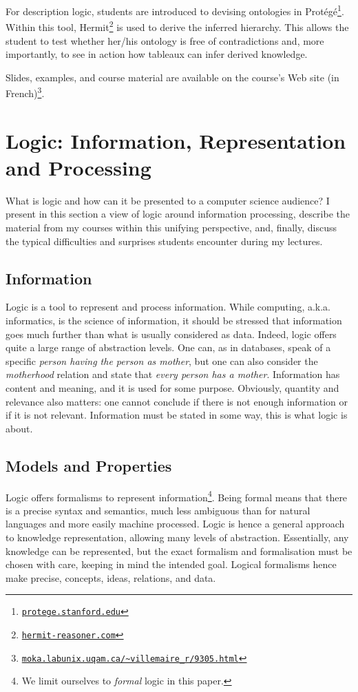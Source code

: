 \documentclass[a4paper,UKenglish]{lipics}
\begin{document}
For description logic, students are introduced to devising ontologies in Prot\'eg\'e\footnote{\href{http://protege.stanford.edu}{\nolinkurl{protege.stanford.edu}}}. Within this tool, Hermit\footnote{\href{http://hermit-reasoner.com}{\nolinkurl{hermit-reasoner.com}}} is used to derive the inferred hierarchy. This allows the student to test whether her/his ontology is free of contradictions and, more importantly, to see in action how tableaux can infer derived knowledge.

Slides, examples, and course material are available on the course's Web site (in French)\footnote{\href{http://moka.labunix.uqam.ca/~villemaire_r/9305.html}{\nolinkurl{moka.labunix.uqam.ca/~villemaire_r/9305.html}}}.
\section{Logic: Information, Representation and Processing}\label{SECLOG} What is logic and how can it be presented to a computer science audience? I present in this section a view of logic around information processing, describe the material from my courses within this unifying perspective, and, finally, discuss the typical difficulties and surprises students encounter during my lectures.
\subsection{Information} Logic is a tool to represent and process information. While computing, a.k.a. informatics, is the science of information, it should be stressed that information goes much further than what is usually considered as data. Indeed, logic offers quite a large range of abstraction levels. One can, as in databases, speak of a specific \emph{person  having the person  as mother}, but one can also consider the \emph{motherhood} relation and state that \emph{every person has a mother}. Information has content and meaning, and it is used for some purpose. Obviously, quantity and relevance also matters: one cannot conclude if there is not enough information or if it is not relevant. Information must be stated in some way, this is what logic is about.
\subsection{Models and Properties}
Logic offers formalisms to represent information\footnote{We limit ourselves to \emph{formal} logic in this paper.}. Being formal means that there is a precise syntax and semantics, much less ambiguous than for natural languages and more easily machine processed. Logic is hence a general approach to knowledge representation, allowing many levels of abstraction. Essentially, any knowledge can be represented, but the exact formalism and formalisation must be chosen with care, keeping in mind the intended goal. Logical formalisms hence make precise, concepts, ideas, relations, and data.
\end{document}
